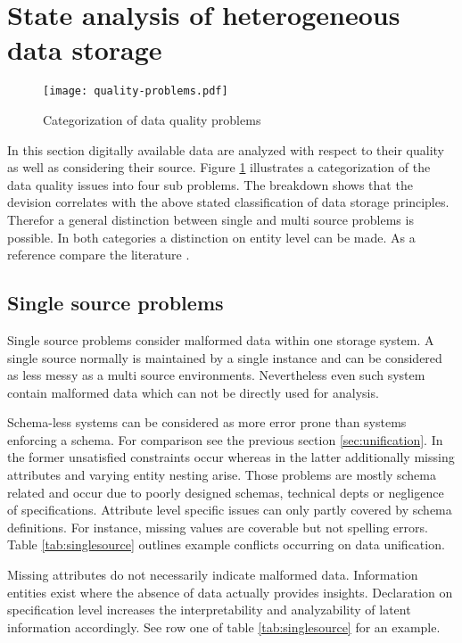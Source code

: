 \section{State analysis of heterogeneous data storage\label{sec:stateanalysis}}

\begin{figure}[htb]
  \centering
  \texttt{[image: quality-problems.pdf]}\\
  \caption{Categorization of data quality problems}\label{fig:qualityproblems}
\end{figure}

In this section digitally available data are analyzed with respect to their quality as well as considering their source. Figure \ref{fig:qualityproblems} illustrates a categorization of the data quality issues into four sub problems. The breakdown shows that the devision correlates with the above stated classification of data storage principles. Therefor a general distinction between single and multi source problems is possible. In both categories a distinction on entity level can be made. As a reference compare the literature \cite{rahm_hai_do_2017}.

\subsection{Single source problems}

Single source problems consider malformed data within one storage system. A single source normally is maintained by a single instance and can be considered as less messy as a multi source environments. Nevertheless even such system contain malformed data which can not be directly used for analysis.

Schema-less systems can be considered as more error prone than systems enforcing a schema. For comparison see the previous section \ref{sec:unification}. In the former unsatisfied constraints occur whereas in the latter additionally missing attributes and varying entity nesting arise. Those problems are mostly schema related and occur due to poorly designed schemas, technical depts or negligence of specifications. Attribute level specific issues can only partly covered by schema definitions. For instance, missing values are coverable but not spelling errors. Table \ref{tab:singlesource} outlines example conflicts occurring on data unification. 

Missing attributes do not necessarily indicate malformed data. Information entities exist where the absence of data actually provides insights. Declaration on specification level increases the interpretability and analyzability of latent information accordingly. See row one of table \ref{tab:singlesource} for an example.

